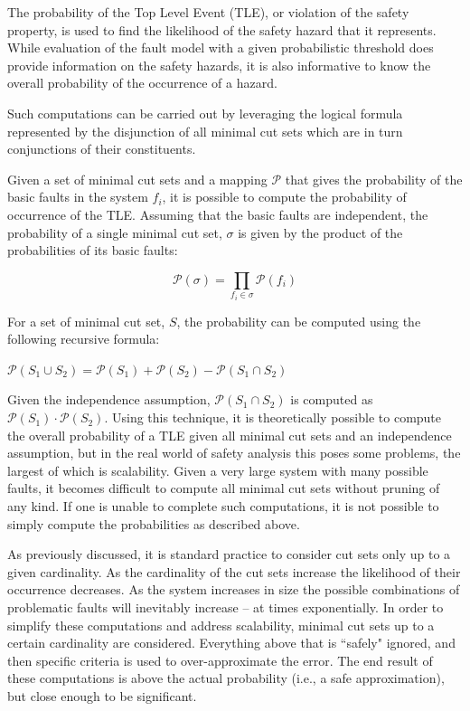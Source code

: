 The probability of the Top Level Event (TLE), or violation of the safety property, is used to find the likelihood of the safety hazard that it represents. While evaluation of the fault model with a given probabilistic threshold does provide information on the safety hazards, it is also informative to know the overall probability of the occurrence of a hazard. 

Such computations can be carried out by leveraging the logical formula represented by the disjunction of all minimal cut sets which are in turn conjunctions of their constituents. 

Given a set of minimal cut sets and a mapping $\mathcal{P}$ that gives the probability of the basic faults in the system $f_i$, it is possible to compute the probability of occurrence of the TLE. Assuming that the basic faults are independent, the probability of a single minimal cut set, $\sigma$ is given by the product of the probabilities of its basic faults:
\begin{center}
    \begin{equation*}\mathcal{P}(\sigma) = \prod_{f_i \in \sigma} \mathcal{P}(f_i) 
    \end{equation*}    
\end{center}

For a set of minimal cut set, $S$, the probability can be computed using the following recursive formula:

\begin{center}
    $\mathcal{P}(S_1 \cup S_2) = \mathcal{P}(S_1) + \mathcal{P}(S_2) - \mathcal{P}(S_1 \cap S_2)$
\end{center}

Given the independence assumption, $\mathcal{P}(S_1 \cap S_2)$ is computed as $\mathcal{P}(S_1) \cdot   \mathcal{P}(S_2)$. Using this technique, it is theoretically possible to compute the overall probability of a TLE given all minimal cut sets and an independence assumption, but in the real world of safety analysis this poses some problems, the largest of which is scalability. Given a very large system with many possible faults, it becomes difficult to compute all minimal cut sets without pruning of any kind. If one is unable to complete such computations, it is not possible to simply compute the probabilities as described above. 

As previously discussed, it is standard practice to consider cut sets only up to a given cardinality. As the cardinality of the cut sets increase the likelihood of their occurrence decreases. As the system increases in size the possible combinations of problematic faults will inevitably increase -- at times exponentially. In order to simplify these computations and address scalability, minimal cut sets up to a certain cardinality are considered. Everything above that is ``safely" ignored, and then specific criteria is used to over-approximate the error. The end result of these computations is above the actual probability (i.e., a safe approximation), but close enough to be significant. 

